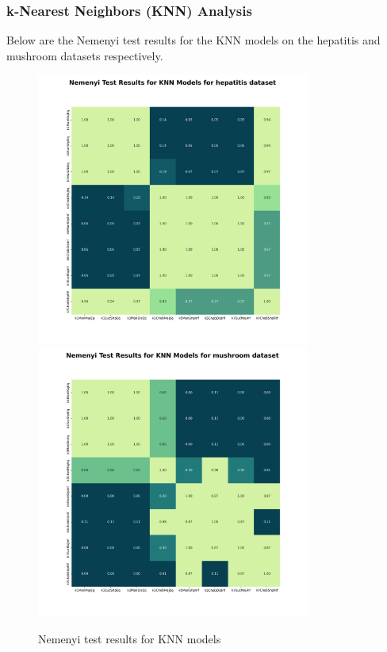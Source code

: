 \subsubsection*{k-Nearest Neighbors (KNN) Analysis}
Below are the Nemenyi test results for the KNN models on the hepatitis and mushroom datasets respectively.

\begin{figure}[!ht]
    \centering
    \includegraphics[width=0.8\textwidth]{figures/nemenyi_test_results_KNN_hepatitis.png}
    \includegraphics[width=0.8\textwidth]{figures/nemenyi_test_results_KNN_mushroom.png}
    \caption{Nemenyi test results for KNN models}
\label{fig:nemenyi-knn}
\end{figure}

